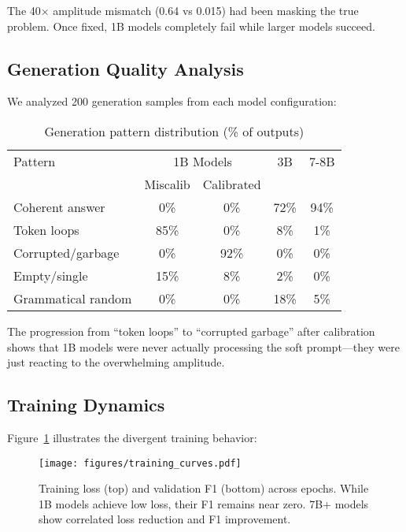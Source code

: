 \documentclass{article}
\begin{document}
The 40$\times$ amplitude mismatch (0.64 vs 0.015) had been masking the true problem. Once fixed, 1B models completely fail while larger models succeed.

\subsection{Generation Quality Analysis}

We analyzed 200 generation samples from each model configuration:

\begin{table}[h]
\caption{Generation pattern distribution (\% of outputs)}
\label{tab:generation_patterns_extended}
\vskip 0.15in
\begin{center}
\begin{small}
\begin{tabular}{lcccc}
\toprule
Pattern & \multicolumn{2}{c}{1B Models} & 3B & 7-8B \\
 & Miscalib & Calibrated & & \\
\midrule
Coherent answer & 0\% & 0\% & 72\% & 94\% \\
Token loops & 85\% & 0\% & 8\% & 1\% \\
Corrupted/garbage & 0\% & 92\% & 0\% & 0\% \\
Empty/single & 15\% & 8\% & 2\% & 0\% \\
Grammatical random & 0\% & 0\% & 18\% & 5\% \\
\bottomrule
\end{tabular}
\end{small}
\end{center}
\vskip -0.1in
\end{table}

The progression from ``token loops'' to ``corrupted garbage'' after calibration shows that 1B models were never actually processing the soft prompt—they were just reacting to the overwhelming amplitude.

\subsection{Training Dynamics}

Figure~\ref{fig:training_curves} illustrates the divergent training behavior:

\begin{figure}[h]
\vskip 0.2in
\begin{center}
\centerline{\texttt{[image: figures/training\_curves.pdf]}}
\caption{Training loss (top) and validation F1 (bottom) across epochs. While 1B models achieve low loss, their F1 remains near zero. 7B+ models show correlated loss reduction and F1 improvement.}
\label{fig:training_curves}
\end{center}
\vskip -0.2in
\end{figure}
\end{document}
